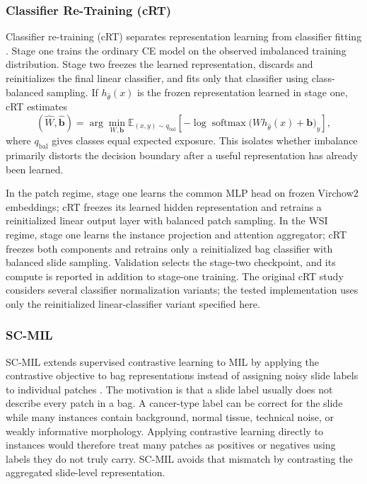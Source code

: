 \documentclass[11pt]{article}
\begin{document}
\subsubsection{Classifier Re-Training (cRT)}
Classifier re-training (cRT) separates representation learning from classifier fitting \citep{kang2020decouplingRepresentation}. Stage one trains the ordinary CE model on the observed imbalanced training distribution. Stage two freezes the learned representation, discards and reinitializes the final linear classifier, and fits only that classifier using class-balanced sampling. If $h_{\widehat\theta}(x)$ is the frozen representation learned in stage one, cRT estimates
\begin{equation}
  (\widehat W,\widehat{\mathbf b})
  =\arg\min_{W,\mathbf b}
  \mathbb E_{(x,y)\sim q_{\mathrm{bal}}}
  \left[-\log\operatorname{softmax}
  \bigl(W h_{\widehat\theta}(x)+\mathbf b\bigr)_y\right],
  \label{eq:crt}
\end{equation}
where $q_{\mathrm{bal}}$ gives classes equal expected exposure. This isolates whether imbalance primarily distorts the decision boundary after a useful representation has already been learned.

In the patch regime, stage one learns the common MLP head on frozen Virchow2 embeddings; cRT freezes its learned hidden representation and retrains a reinitialized linear output layer with balanced patch sampling. In the WSI regime, stage one learns the instance projection and attention aggregator; cRT freezes both components and retrains only a reinitialized bag classifier with balanced slide sampling. Validation selects the stage-two checkpoint, and its compute is reported in addition to stage-one training. The original cRT study considers several classifier normalization variants; the tested implementation uses only the reinitialized linear-classifier variant specified here.

\subsubsection{SC-MIL}
SC-MIL extends supervised contrastive learning to MIL by applying the contrastive objective to bag representations instead of assigning noisy slide labels to individual patches \citep{juyal2024scMil}. The motivation is that a slide label usually does not describe every patch in a bag. A cancer-type label can be correct for the slide while many instances contain background, normal tissue, technical noise, or weakly informative morphology. Applying contrastive learning directly to instances would therefore treat many patches as positives or negatives using labels they do not truly carry. SC-MIL avoids that mismatch by contrasting the aggregated slide-level representation.
\end{document}
